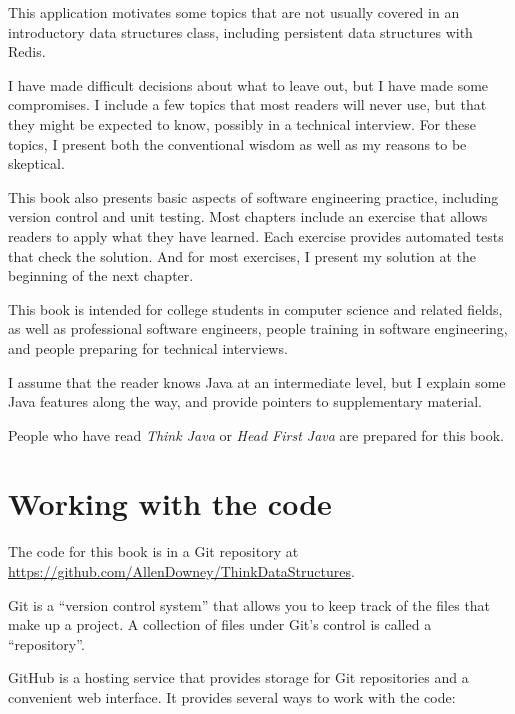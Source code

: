 \documentclass[12pt]{book}
\theoremstyle{exercise}
\begin{document}
This application motivates some topics that are not usually
covered in an introductory data structures class, including persistent
data structures with Redis.

I have made difficult decisions about what to leave out, but 
I have made some compromises.  I include a few topics
that most readers will never use, but that they might be expected to
know, possibly in a technical interview.  For these topics, I
present both the conventional wisdom as well as my reasons to be
skeptical. 

This book also presents basic aspects of software engineering practice,
including version control and unit testing.  Most chapters include
an exercise that allows readers to apply what they have learned.
Each exercise provides automated tests that check the solution.
And for most exercises, I present my solution at the beginning of
the next chapter.

This book is intended for college students in computer science and
related fields, as well as professional software engineers, people
training in software engineering, and people preparing for technical
interviews.

I assume that the reader knows Java at an intermediate level,
but I explain some Java features along the way, and provide pointers
to supplementary material.

People who have read {\it Think Java} or {\it Head First
Java} are prepared for this book.


\section*{Working with the code}
\label{code}

The code for this book is in a Git repository at
\url{https://github.com/AllenDowney/ThinkDataStructures}.

Git is a ``version control system'' that allows you to keep track of
the files that make up a project.  A collection of files under Git's
control is called a ``repository''.


GitHub is a hosting service that provides storage for Git repositories
and a convenient web interface.  It provides several ways to work with
the code:
\end{document}
